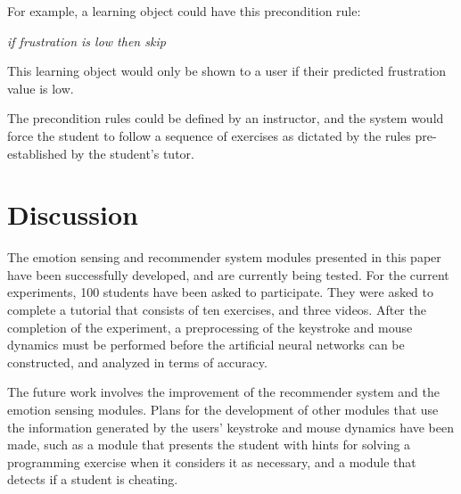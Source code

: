 \documentclass{acm_proc_article-sp}
\begin{document}
For example, a learning object could have this precondition rule:

\textit{if frustration is low then skip}

This learning object would only be shown to a user if their predicted
frustration value is low.

The precondition rules could be defined by an instructor, and the
system would force the student to follow a sequence of exercises as
dictated by the rules pre-established by the student's tutor.


\section{Discussion}
\label{discussion}

The emotion sensing and recommender system modules presented in this
paper have been successfully developed, and are currently being
tested. For the current experiments, 100 students have been asked to
participate. They were asked to complete a tutorial that consists of
ten exercises, and three videos. After the completion of the
experiment, a preprocessing of the keystroke and mouse dynamics must
be performed before the artificial neural networks can be constructed,
and analyzed in terms of accuracy.

The future work involves the improvement of the recommender system and
the emotion sensing modules. Plans for the development of other
modules that use the information generated by the users' keystroke and
mouse dynamics have been made, such as a module that presents the
student with hints for solving a programming exercise when it
considers it as necessary, and a module that detects if a student is
cheating.




\balancecolumns
\end{document}

